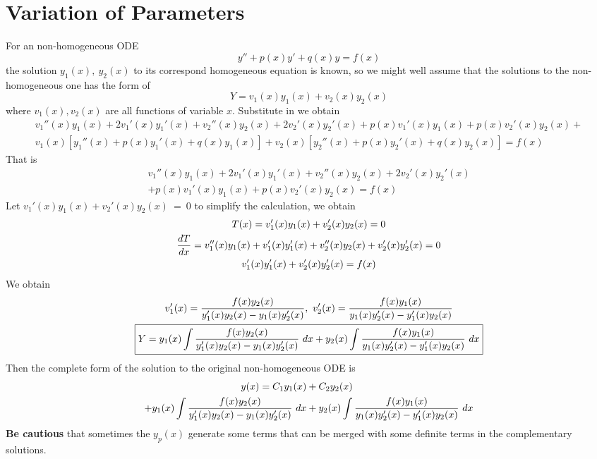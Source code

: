 \documentclass[25pt]{article}
\begin{document}
\section{Variation of Parameters}
For an non-homogeneous ODE
\begin{equation}
    y'' + p(x)y' + q(x)y = f(x)
\end{equation}
the solution $y_1(x),~y_2(x)$ to its correspond homogeneous equation is known, so we might well assume that the solutions to the non-homogeneous one has the form of
\begin{equation}
    Y = v_1(x)y_1(x) + v_2(x)y_2(x)
\end{equation}
where $v_1(x), v_2(x)$ are all functions of variable $x$. Substitute in we obtain
\begin{gather}
    v_1''(x)y_1(x) + 2v_1'(x)y_1'(x) + v_2''(x)y_2(x) + 2v_2'(x)y_2'(x)  +p(x)v_1'(x)y_1(x) +p(x)v_2'(x)y_2(x) +\\ v_1(x)[y_1''(x) + 
    p(x)y_1'(x) + q(x)y_1(x)] + v_2(x)[y_2''(x) + p(x)y_2'(x) + q(x)y_2(x) ] = f(x)
\end{gather}
That is
\begin{equation}
\begin{aligned}
    v_1''(x)y_1(x) + 2v_1'(x)y_1'(x) + v_2''(x)y_2(x) + 2v_2'(x)y_2'(x) \\ +p(x)v_1'(x)y_1(x) +p(x)v_2'(x)y_2(x) = f(x)
\end{aligned}
\end{equation}
\noindent Let $v_1'(x)y_1(x) + v_2'(x)y_2(x)~=~0$ to simplify the calculation, we obtain
\begin{gather}
    T(x) = v_1'(x)y_1(x) + v_2'(x)y_2(x) = 0\notag \\
    \frac{dT}{dx} = v_1''(x)y_1(x) + v_1'(x)y_1'(x) + v_2''(x)y_2(x) + v_2'(x) y_2'(x) = 0 \notag \\
    v_1'(x)y_1'(x) + v_2'(x)y_2'(x) = f(x) \notag
\end{gather}
We obtain
\begin{gather}
    v_1'(x) = \frac{f(x)y_2(x)}{y_1'(x)y_2(x) - y_1(x)y_2'(x)}, ~ v_2'(x) = 
    \frac{f(x)y_1(x)}{y_1(x)y_2'(x)-y_1'(x)y_2(x)} \notag \\
    \boxed{Y = y_1(x) \int \frac{f(x)y_2(x)}{y_1'(x)y_2(x) - y_1(x)y_2'(x)} ~dx + y_2(x) \int \frac{f(x)y_1(x)}{y_1(x)y_2'(x)-y_1'(x)y_2(x)} ~dx} \notag
\end{gather}
Then the complete form of the solution to the original non-homogeneous ODE is 
\begin{equation}
\begin{aligned}
    y(x) = C_1y_1(x) &+ C_2y_2(x) \\ + y_1(x) \int \frac{f(x)y_2(x)}{y_1'(x)y_2(x) - y_1(x)y_2'(x)} ~dx &+ y_2(x) \int \frac{f(x)y_1(x)}{y_1(x)y_2'(x)-y_1'(x)y_2(x)} ~dx  \notag 
\end{aligned}
\end{equation}
\textbf{Be cautious} that sometimes the $y_p(x)$ generate some terms that can be merged with some definite terms in the complementary solutions.
\end{document}
